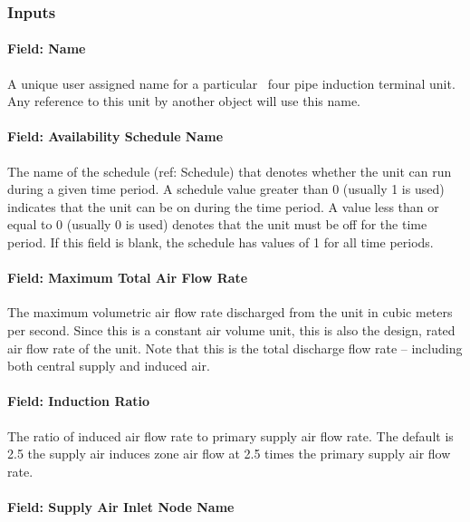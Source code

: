 \subsubsection{Inputs}\label{inputs-9-000}

\paragraph{Field: Name}\label{field-name-9-000}

A unique user assigned name for a particular~ four pipe induction terminal unit. Any reference to this unit by another object will use this name.

\paragraph{Field: Availability Schedule Name}\label{field-availability-schedule-name-9}

The name of the schedule (ref: Schedule) that denotes whether the unit can run during a given time period. A schedule value greater than 0 (usually 1 is used) indicates that the unit can be on during the time period. A value less than or equal to 0 (usually 0 is used) denotes that the unit must be off for the time period. If this field is blank, the schedule has values of 1 for all time periods.

\paragraph{Field: Maximum Total Air Flow Rate}\label{field-maximum-total-air-flow-rate}

The maximum volumetric air flow rate discharged from the unit in cubic meters per second. Since this is a constant air volume unit, this is also the design, rated air flow rate of the unit. Note that this is the total discharge flow rate -- including both central supply and induced air.

\paragraph{Field: Induction Ratio}\label{field-induction-ratio}

The ratio of induced air flow rate to primary supply air flow rate. The default is 2.5 the supply air induces zone air flow at 2.5 times the primary supply air flow rate.

\paragraph{Field: Supply Air Inlet Node Name}\label{field-supply-air-inlet-node-name-2}

